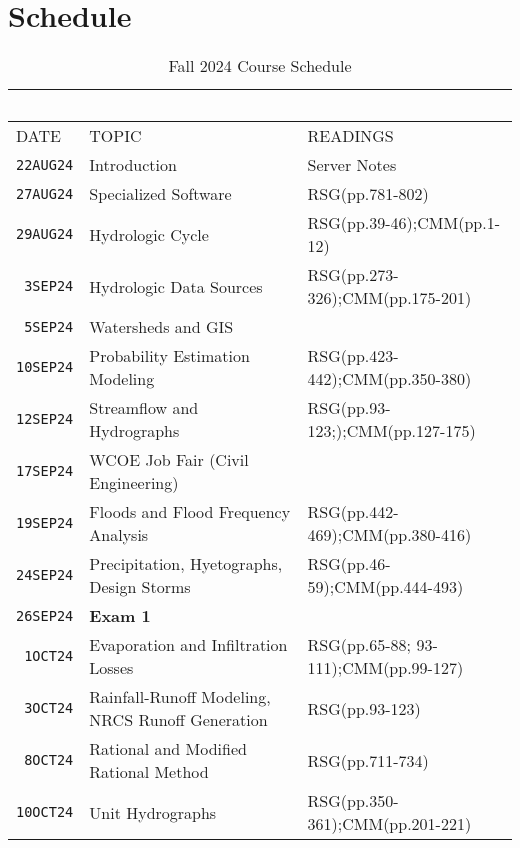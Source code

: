 \documentclass[12pt]{article}
\begin{document}
\section*{Schedule}
\begin{table}[ht!]
   \centering
   \caption{Fall 2024 Course Schedule}
   \begin{tabular}{p{0.5in}p{3.0in}p{3.0in}} 
   ~ & ~ & ~  \\
\hline
DATE & TOPIC & READINGS  \\
\hline
\texttt{22AUG24} & Introduction & Server Notes  \\ %
\texttt{27AUG24} & Specialized Software & RSG(pp.781-802) \\ %
\texttt{29AUG24} & Hydrologic Cycle  & RSG(pp.39-46);CMM(pp.1-12)\\ %
\texttt{~3SEP24} & Hydrologic Data Sources & RSG(pp.273-326);CMM(pp.175-201)\\ %
\texttt{~5SEP24} & Watersheds and GIS &  \\ %
\texttt{10SEP24} & Probability Estimation Modeling &  RSG(pp.423-442);CMM(pp.350-380)\\ %
\texttt{12SEP24} & Streamflow and Hydrographs & RSG(pp.93-123;);CMM(pp.127-175)\\ %
\texttt{17SEP24} & WCOE Job Fair (Civil Engineering)   &   \\ %
\texttt{19SEP24} & Floods and Flood Frequency Analysis & RSG(pp.442-469);CMM(pp.380-416) \\ %
\texttt{24SEP24} & Precipitation, Hyetographs, Design Storms &  RSG(pp.46-59);CMM(pp.444-493) \\  %
\texttt{26SEP24} & \textbf{Exam 1} &  \\ %
\texttt{~1OCT24} & Evaporation and Infiltration Losses & RSG(pp.65-88; 93-111);CMM(pp.99-127) \\ %
\texttt{~3OCT24} & Rainfall-Runoff Modeling, NRCS Runoff Generation & RSG(pp.93-123) \\ %
\texttt{~8OCT24} & Rational and Modified Rational Method & RSG(pp.711-734) \\  %
\texttt{10OCT24} & Unit Hydrographs & RSG(pp.350-361);CMM(pp.201-221)\\ %

\end{tabular}
\end{table}
\end{document}
